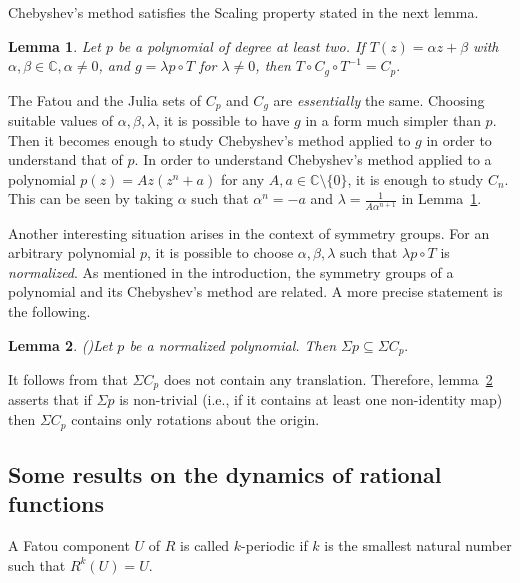 \documentclass[12pt]{article}
\newtheorem{lem}{Lemma}[section]
\begin{document}
Chebyshev's method satisfies the Scaling property stated in the next lemma.
\begin{lem}\cite[Theorem~2.2]{Nayak-Pal2022}
Let $p$ be a polynomial of degree at least two. If $T(z) = \alpha z + \beta$ with $\alpha, \beta \in \mathbb{C}, \alpha \neq 0$, and $g = \lambda p \circ T$ for $\lambda \neq 0$, then 
	$T \circ C_g \circ T^{-1} = C_p.$ 
	\label{Scaling}
\end{lem}
The Fatou and the Julia sets of $C_p$ and $C_g$ are \textit{essentially} the same.
Choosing suitable values of  $\alpha, \beta, \lambda$, it is possible to have $g$ in a  form much simpler than $p$. Then it becomes enough to study Chebyshev's method applied to $g$ in order to understand that of $p$. In order to understand Chebyshev's method applied to a polynomial $p (z)=A z(z^n+a)$ for any $ A,a\in\mathbb{C}\setminus\{0\}$, it is enough to study $C_n$. This can be seen by taking $\alpha$ such that $\alpha^n =-a$ and $\lambda =\frac{1}{A \alpha^{n+1}}$ in Lemma~\ref{Scaling}.


Another interesting situation arises in the context of symmetry groups. 
For an arbitrary polynomial $p$, it is possible to choose $\alpha, \beta, \lambda$ such that $\lambda p \circ T$ is \emph{normalized}. As mentioned in the introduction, the symmetry groups of a polynomial and its Chebyshev's method are related. A more precise statement is the following. 
\begin{lem}(\cite[Corollary 1.1.1]{Sym_dyn})\label{Sym_C_p}
Let $p$ be a normalized polynomial. Then $\Sigma p \subseteq \Sigma C_p.$
\end{lem}
It follows from \cite[Theorem~1.2]{Sym_dyn} that $\Sigma C_p$ does not contain any translation. Therefore, lemma~\ref{Sym_C_p} asserts that if $\Sigma p$ is non-trivial (i.e., if it contains at least one non-identity map) then $\Sigma C_p$ contains only rotations about the origin.	

\subsection{Some results on the dynamics of rational functions}\label{dyn_results}
	
A Fatou component $U$ of $R$ is called $k$-periodic if $k$ is the smallest natural number such that $R^k (U)=U$. 
	
\end{document}
